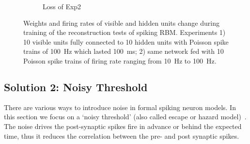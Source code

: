 \begin{figure}
\begin{subfigure}[t]{0.4\textwidth}
		\caption{Loss of Exp2}
	\end{subfigure}
	\caption{Weights and firing rates of visible and hidden units change during training of the reconstruction tests of spiking RBM. 
		Experiments 1) 10 visible units fully connected to 10 hidden units with Poisson spike trains of 100~Hz which lasted 100~ms; 2) same network fed with 10 Poisson spike trains of firing rate ranging from 10~Hz to 100~Hz.}
\end{figure}
\subsection{Solution 2: Noisy Threshold}
There are various ways to introduce noise in formal spiking neuron models. In this section we focus on a `noisy threshold' (also called escape or hazard model)~\cite{gerstner2002spiking}.
The noise drives the post-synaptic spikes fire in advance or behind the expected time, thus it reduces the correlation between the pre- and post synaptic spikes.

